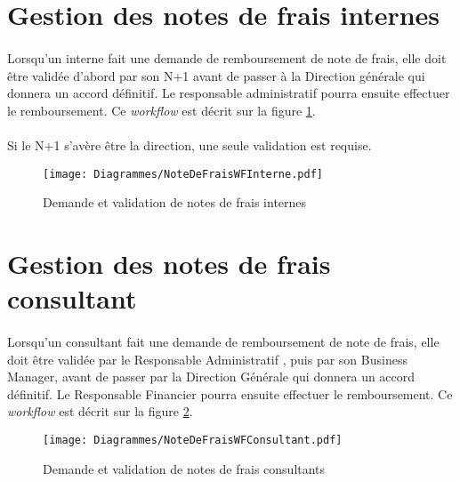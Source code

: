 \section{Gestion des notes de frais internes}

\paragraph{} Lorsqu'un interne fait une demande de remboursement de note de frais, elle doit être validée d'abord par son N+1 avant de passer à la Direction générale qui donnera un accord définitif. Le responsable administratif pourra ensuite effectuer le remboursement. Ce \textit{workflow} est décrit sur la figure \ref{ndfI}.
\paragraph{} Si le N+1 s'avère être la direction, une seule validation est requise.


\begin{figure}[H]
	\centering
	\texttt{[image: Diagrammes/NoteDeFraisWFInterne.pdf]}
	\caption{Demande et validation de notes de frais internes} 
	\label{ndfI}
\end{figure}

\section{Gestion des notes de frais consultant}

\paragraph{} Lorsqu'un consultant fait une demande de remboursement de note de frais, elle doit être validée par le Responsable Administratif , puis par son Business Manager, avant de passer par la Direction Générale qui donnera un accord définitif. Le Responsable Financier pourra ensuite effectuer le remboursement. Ce \textit{workflow} est décrit sur la figure \ref{ndfC}.

\begin{figure}[H]
	\centering
	\texttt{[image: Diagrammes/NoteDeFraisWFConsultant.pdf]}
	\caption{Demande et validation de notes de frais consultants}
	\label{ndfC}
\end{figure}
